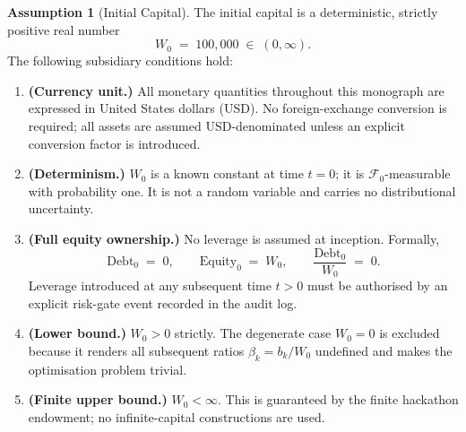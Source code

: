 \documentclass[12pt,openany]{book}
\newcommand{\calF}{\mathcal{F}}
\numberwithin{equation}{chapter}
\theoremstyle{plain}
\theoremstyle{definition}
\newtheorem{assumption}[theorem]{Assumption}
\theoremstyle{remark}
\numberwithin{equation}{chapter}
\theoremstyle{plain}
\begin{document}
\begin{assumption}[Initial Capital]
\label{asm:initial-capital}
\label{asm:finite-capital}
The initial capital is a deterministic, strictly positive real number
\begin{equation}
  W_0 \;=\; 100{,}000 \;\in\; (0,\infty).
  \label{eq:W0}
\end{equation}
The following subsidiary conditions hold:
\begin{enumerate}[label=\textbf{(IC\arabic*)}]
  \item \textbf{(Currency unit.)}
        All monetary quantities throughout this monograph are expressed
        in United States dollars (USD).  No foreign-exchange conversion
        is required; all assets are assumed USD-denominated unless an
        explicit conversion factor is introduced.

  \item \textbf{(Determinism.)}
        $W_0$ is a known constant at time $t = 0$; it is
        $\calF_0$-measurable with probability one.
        It is not a random variable and carries no distributional
        uncertainty.

  \item \textbf{(Full equity ownership.)}
        No leverage is assumed at inception.  Formally,
        \begin{equation}
          \text{Debt}_0 \;=\; 0,
          \qquad
          \text{Equity}_0 \;=\; W_0,
          \qquad
          \frac{\text{Debt}_0}{W_0} \;=\; 0.
          \label{eq:no-leverage}
        \end{equation}
        Leverage introduced at any subsequent time $t > 0$ must be
        authorised by an explicit risk-gate event recorded in the
        audit log.

  \item \textbf{(Lower bound.)}
        $W_0 > 0$ strictly.  The degenerate case $W_0 = 0$ is
        excluded because it renders all subsequent ratios
        $\beta_k = b_k / W_0$ undefined and makes the optimisation
        problem trivial.

  \item \textbf{(Finite upper bound.)}
        $W_0 < \infty$.  This is guaranteed by the finite hackathon
        endowment; no infinite-capital constructions are used.
\end{enumerate}
\end{assumption}
\end{document}
